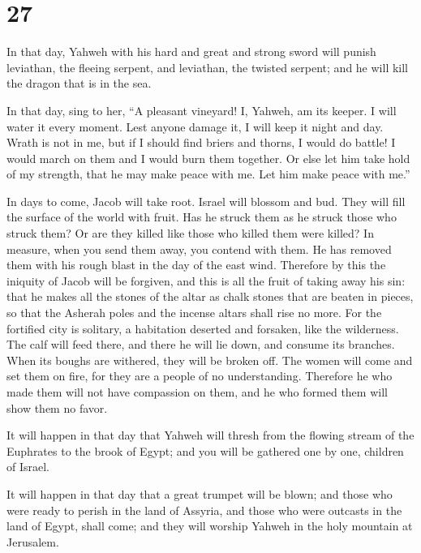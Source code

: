 \hypertarget{section-26}{%
\section{27}\label{section-26}}

 In that day, Yahweh with his hard and great and strong
sword will punish leviathan, the fleeing serpent, and leviathan, the
twisted serpent; and he will kill the dragon that is in the sea.

 In that day, sing to her, ``A pleasant vineyard!
 I, Yahweh, am its keeper. I will water it every moment.
Lest anyone damage it, I will keep it night and day.  Wrath
is not in me, but if I should find briers and thorns, I would do battle!
I would march on them and I would burn them together.  Or
else let him take hold of my strength, that he may make peace with me.
Let him make peace with me.''

 In days to come, Jacob will take root. Israel will blossom
and bud. They will fill the surface of the world with fruit.
 Has he struck them as he struck those who struck them? Or
are they killed like those who killed them were killed?  In
measure, when you send them away, you contend with them. He has removed
them with his rough blast in the day of the east wind. 
Therefore by this the iniquity of Jacob will be forgiven, and this is
all the fruit of taking away his sin: that he makes all the stones of
the altar as chalk stones that are beaten in pieces, so that the Asherah
poles and the incense altars shall rise no more.  For the
fortified city is solitary, a habitation deserted and forsaken, like the
wilderness. The calf will feed there, and there he will lie down, and
consume its branches.  When its boughs are withered, they
will be broken off. The women will come and set them on fire, for they
are a people of no understanding. Therefore he who made them will not
have compassion on them, and he who formed them will show them no favor.

 It will happen in that day that Yahweh will thresh from
the flowing stream of the Euphrates to the brook of Egypt; and you will
be gathered one by one, children of Israel.

 It will happen in that day that a great trumpet will be
blown; and those who were ready to perish in the land of Assyria, and
those who were outcasts in the land of Egypt, shall come; and they will
worship Yahweh in the holy mountain at Jerusalem.

